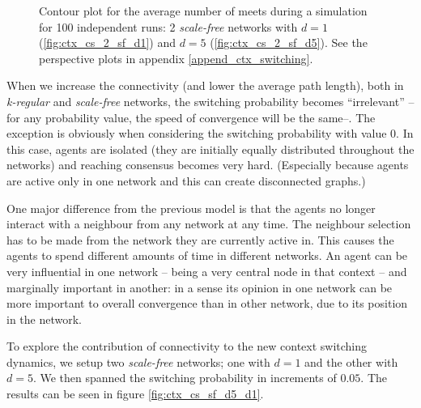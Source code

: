 \documentclass[preprint,number]{elsarticle}
\begin{document}
\begin{figure}[H]
	\begin{minipage}{0.9\linewidth}
          \vspace{0.2cm}
          \caption{Contour plot for the average number of meets during a simulation for 100
            independent runs: 2 \textit{scale-free} networks with $d=1$ (\ref{fig:ctx_cs_2_sf_d1})
            and $d=5$ (\ref{fig:ctx_cs_2_sf_d5}). See the perspective plots in appendix
            \ref{append_ctx_switching}.}
          \label{fig:ctx_cs_2_sf}
	\end{minipage}
      \end{figure}

      When we increase the connectivity (and lower the average path length), both in
      \textit{k-regular} and \textit{scale-free} networks, the switching probability becomes
      ``irrelevant'' --for any probability value, the speed of convergence will be the same--. The
      exception is obviously when considering the switching probability with value $0$. In this
      case, agents are isolated (they are initially equally distributed throughout the networks) and
      reaching consensus becomes very hard. (Especially because agents are active only in one network
      and this can create disconnected graphs.)

      One major difference from the previous model is that the agents no longer interact with a
      neighbour from any network at any time. The neighbour selection has to be made from the
      network they are currently active in. This causes the agents to spend different amounts of
      time in different networks. An agent can be very influential in one network -- being a very
      central node in that context -- and marginally important in another: in a sense its opinion in
      one network can be more important to overall convergence than in other network, due to its
      position in the network.

      To explore the contribution of connectivity to the new context switching dynamics, we setup
      two \textit{scale-free} networks; one with $d=1$ and the other with $d=5$. We then spanned the
      switching probability in increments of $0.05$. The results can be seen in figure
      \ref{fig:ctx_cs_sf_d5_d1}.
\end{document}
